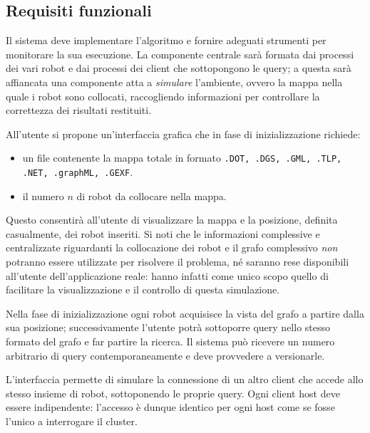\subsection{Requisiti funzionali}
\label{sec:func-req}
Il sistema deve implementare l'algoritmo e fornire adeguati strumenti
per monitorare la sua esecuzione.
La componente centrale sarà formata dai processi dei vari robot e dai
processi dei client che sottopongono le query; a questa
sarà affiancata una componente atta a \emph{simulare}
l'ambiente, ovvero la mappa nella quale i robot sono collocati,
raccogliendo informazioni per controllare la correttezza dei risultati
restituiti.

All'utente si propone un'interfaccia grafica che in
fase di inizializzazione richiede:
\begin{itemize}
\item un file contenente la mappa totale in formato
      \texttt{.DOT, .DGS, .GML, .TLP, .NET, .graphML, .GEXF}.
\item il numero $n$ di robot da collocare nella mappa.
\end{itemize}
Questo consentirà all'utente di visualizzare la mappa e la posizione,
definita casualmente, dei robot inseriti. Si noti che le
informazioni complessive e centralizzate riguardanti la collocazione
dei robot e il grafo complessivo \emph{non} potranno essere
utilizzate per risolvere il problema, né saranno rese disponibili
all'utente dell'applicazione reale: hanno infatti come unico scopo
quello di facilitare la visualizzazione e il controllo di
questa simulazione.

Nella fase di inizializzazione ogni robot acquisisce la vista del
grafo a partire dalla sua posizione;
successivamente l'utente potrà sottoporre query nello stesso formato
del grafo e far partire la ricerca.
Il sistema può ricevere un numero arbitrario di query
contemporaneamente e deve provvedere a versionarle.

L'interfaccia permette di simulare la connessione di un altro
client che accede allo stesso insieme di robot, sottoponendo
le proprie query. Ogni client host deve essere indipendente:
l'accesso è dunque identico per ogni host come se fosse l'unico a
interrogare il cluster.


